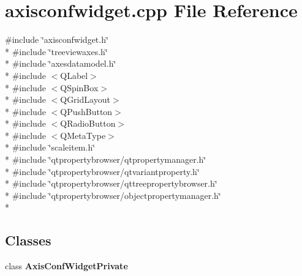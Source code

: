 \section{axisconfwidget.\+cpp File Reference}
\label{axisconfwidget_8cpp}
{\ttfamily \#include \char`\"{}axisconfwidget.\+h\char`\"{}}\\*
{\ttfamily \#include \char`\"{}treeviewaxes.\+h\char`\"{}}\\*
{\ttfamily \#include \char`\"{}axesdatamodel.\+h\char`\"{}}\\*
{\ttfamily \#include $<$Q\+Label$>$}\\*
{\ttfamily \#include $<$Q\+Spin\+Box$>$}\\*
{\ttfamily \#include $<$Q\+Grid\+Layout$>$}\\*
{\ttfamily \#include $<$Q\+Push\+Button$>$}\\*
{\ttfamily \#include $<$Q\+Radio\+Button$>$}\\*
{\ttfamily \#include $<$Q\+Meta\+Type$>$}\\*
{\ttfamily \#include \char`\"{}scaleitem.\+h\char`\"{}}\\*
{\ttfamily \#include \char`\"{}qtpropertybrowser/qtpropertymanager.\+h\char`\"{}}\\*
{\ttfamily \#include \char`\"{}qtpropertybrowser/qtvariantproperty.\+h\char`\"{}}\\*
{\ttfamily \#include \char`\"{}qtpropertybrowser/qttreepropertybrowser.\+h\char`\"{}}\\*
{\ttfamily \#include \char`\"{}qtpropertybrowser/objectpropertymanager.\+h\char`\"{}}\\*
\subsection*{Classes}
\begin{DoxyCompactItemize}
\item 
class {\bf Axis\+Conf\+Widget\+Private}
\end{DoxyCompactItemize}
